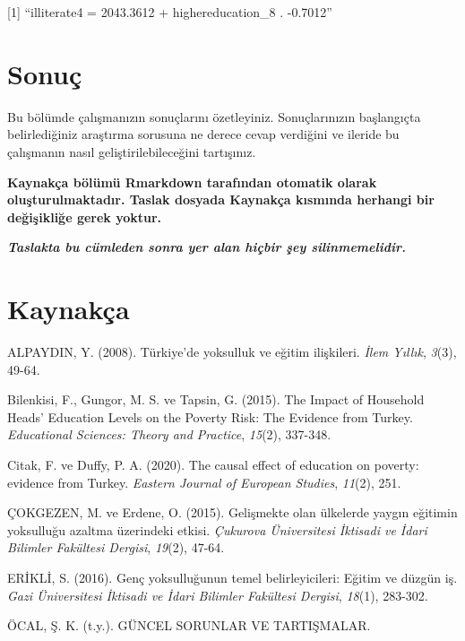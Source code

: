 \documentclass[
  12pt,
]{article}
\newlength{\cslhangindent}
\newlength{\cslentryspacingunit} %
\newenvironment{CSLReferences}[2] %
 {%
  \setlength{\parindent}{0pt}
  \ifodd #1
  \let\oldpar\par
  \def\par{\hangindent=\cslhangindent\oldpar}
  \fi
  \setlength{\parskip}{#2\cslentryspacingunit}
 }%
 {}
\begin{document}
{[}1{]} ``illiterate4 = 2043.3612 + highereducation\_8 . -0.7012''

\hypertarget{sonuuxe7}{%
\section{Sonuç}\label{sonuuxe7}}

Bu bölümde çalışmanızın sonuçlarını özetleyiniz. Sonuçlarınızın başlangıçta belirlediğiniz araştırma sorusuna ne derece cevap verdiğini ve ileride bu çalışmanın nasıl geliştirilebileceğini tartışınız.

\textbf{Kaynakça bölümü Rmarkdown tarafından otomatik olarak oluşturulmaktadır. Taslak dosyada Kaynakça kısmında herhangi bir değişikliğe gerek yoktur.}

\textbf{\emph{Taslakta bu cümleden sonra yer alan hiçbir şey silinmemelidir.}}

\newpage

\hypertarget{references}{%
\section{Kaynakça}\label{references}}

\hypertarget{refs}{}
\begin{CSLReferences}{1}{0}
\leavevmode{}%
ALPAYDIN, Y. (2008). T{ü}rkiye'de yoksulluk ve e{ğ}itim ili{ş}kileri. \emph{{İ}lem Y{ı}ll{ı}k}, \emph{3}(3), 49-64.

\leavevmode{}%
Bilenkisi, F., Gungor, M. S. ve Tapsin, G. (2015). The Impact of Household Heads' Education Levels on the Poverty Risk: The Evidence from Turkey. \emph{Educational Sciences: Theory and Practice}, \emph{15}(2), 337-348.

\leavevmode{}%
Citak, F. ve Duffy, P. A. (2020). The causal effect of education on poverty: evidence from Turkey. \emph{Eastern Journal of European Studies}, \emph{11}(2), 251.

\leavevmode{}%
ÇOKGEZEN, M. ve Erdene, O. (2015). Geli{ş}mekte olan {ü}lkelerde yayg{ı}n e{ğ}itimin yoksullu{ğ}u azaltma {ü}zerindeki etkisi. \emph{{Ç}ukurova {Ü}niversitesi {İ}ktisadi ve {İ}dari Bilimler Fak{ü}ltesi Dergisi}, \emph{19}(2), 47-64.

\leavevmode{}%
ERİKLİ, S. (2016). Gen{ç} yoksullu{ğ}unun temel belirleyicileri: E{ğ}itim ve d{ü}zg{ü}n i{ş}. \emph{Gazi {Ü}niversitesi {İ}ktisadi ve {İ}dari Bilimler Fak{ü}ltesi Dergisi}, \emph{18}(1), 283-302.

\leavevmode{}%
ÖCAL, Ş. K. (t.y.). G{Ü}NCEL SORUNLAR VE TARTI{Ş}MALAR.

\end{CSLReferences}
\end{document}
